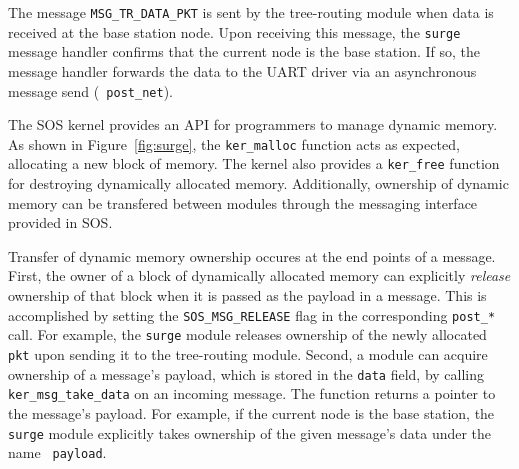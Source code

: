 The message {\tt MSG\_TR\_DATA\_PKT} is sent by the tree-routing
module when data is received at the base station node.  Upon receiving
this message, the {\tt surge} message handler confirms that the
current node is the base station.  If so, the message handler forwards
the data to the UART driver via an asynchronous message send ({\tt
post\_net}).

The SOS kernel provides an API for programmers to manage dynamic
memory.  As shown in Figure~\ref{fig:surge}, the {\tt ker\_malloc}
function acts as expected, allocating a new block of memory.  The
kernel also provides a {\tt ker\_free} function for destroying
dynamically allocated memory.  Additionally, ownership of dynamic
memory can be transfered between modules through the messaging
interface provided in SOS.

%
%

Transfer of dynamic memory ownership occures at the end points of a
message.  First, the owner of a block of dynamically allocated memory
can explicitly {\em release} ownership of that block when it is passed
as the payload in a message.  This is accomplished by setting the
\texttt{SOS\_MSG\_RELEASE} flag in the corresponding {\tt post\_*}
call.  For example, the {\tt surge} module releases ownership of the
newly allocated {\tt pkt} upon sending it to the tree-routing module.
Second, a module can acquire ownership of a message's payload, which
is stored in the {\tt data} field, by calling
\texttt{ker\_msg\_take\_data} on an incoming message.  The function
returns a pointer to the message's payload.  For example, if the
current node is the base station, the {\tt surge} module explicitly
takes ownership of the given message's data under the name {\tt
payload}.

